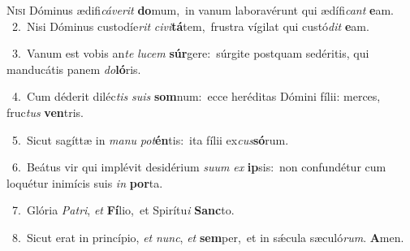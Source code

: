 \lettrine{\initial\textcolor{\initialcolor}{N}}{isi} Dóminus ædifi\-\textit{cá}\-\textit{ve}\textit{rit} \textbf{do}\-mum,~\star in vanum laboravérunt qui ædífi\textit{cant} \textbf{e}\-am.\\
{\numbfont\textcolor{\numbcolor}{~2.}}~Nisi Dóminus custodíe\textit{rit} \textit{ci}\-\textit{vi}\textbf{tá}tem,~\star frustra vígilat qui custó\textit{dit} \textbf{e}\-am.\par
{\numbfont\textcolor{\numbcolor}{~3.}}~Vanum est vobis an\textit{te} \textit{lu}\-\textit{cem} \textbf{súr}\-gere:~\star súrgite postquam sedéritis, qui manducátis panem \textit{do}\-\textbf{ló}ris.\par
{\numbfont\textcolor{\numbcolor}{~4.}}~Cum déderit diléc\textit{tis} \textit{su}\-\textit{is} \textbf{som}\-num:~\star ecce heréditas Dómini fílii: merces, fruc\textit{tus} \textbf{ven}\-tris.\par
{\numbfont\textcolor{\numbcolor}{~5.}}~Sicut sagíttæ in \textit{ma}\-\textit{nu} \textit{pot}\-\textbf{én}tis:~\star ita fílii ex\-\textit{cus}\-\textbf{só}rum.\par
{\numbfont\textcolor{\numbcolor}{~6.}}~Beátus vir qui implévit desidérium \textit{su}\-\textit{um} \textit{ex} \textbf{ip}\-sis:~\star non confundétur cum loquétur inimícis suis \textit{in} \textbf{por}\-ta.\par
{\numbfont\textcolor{\numbcolor}{~7.}}~Glória \textit{Pa}\-\textit{tri}, \textit{et} \textbf{Fí}\-lio,~\star et Spirítu\textit{i} \textbf{Sanc}\-to.\par
{\numbfont\textcolor{\numbcolor}{~8.}}~Sicut erat in princípio, \textit{et} \textit{nunc}\-, \textit{et} \textbf{sem}\-per,~\star et in sǽcula sæculó\-\textit{rum}\-. \textbf{A}\-men.\par
